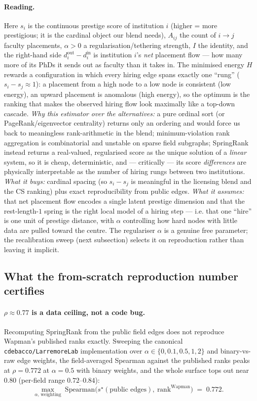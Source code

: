 \documentclass[11pt]{article}
\begin{document}
\paragraph{Reading.} Here $s_i$ is the continuous prestige score of institution $i$ (higher = more prestigious; it is the cardinal object our blend needs), $A_{ij}$ the count of $i\to j$ faculty placements, $\alpha>0$ a regularisation/tethering strength, $I$ the identity, and the right-hand side $d^{\text{out}}_i - d^{\text{in}}_i$ is institution $i$'s \emph{net} placement flow --- how many more of its PhDs it sends out as faculty than it takes in. The minimised energy $H$ rewards a configuration in which every hiring edge spans exactly one ``rung'' ($s_i - s_j \approx 1$): a placement from a high node to a low node is consistent (low energy), an upward placement is anomalous (high energy), so the optimum is the ranking that makes the observed hiring flow look maximally like a top-down cascade. \emph{Why this estimator over the alternatives:} a pure ordinal sort (or PageRank/eigenvector centrality) returns only an ordering and would force us back to meaningless rank-arithmetic in the blend; minimum-violation rank aggregation is combinatorial and unstable on sparse field subgraphs; SpringRank instead returns a real-valued, regularised score as the unique solution of a \emph{linear} system, so it is cheap, deterministic, and --- critically --- its score \emph{differences} are physically interpretable as the number of hiring rungs between two institutions. \emph{What it buys:} cardinal spacing (so $s_i - s_j$ is meaningful in the licensing blend and the CS ranking) plus exact reproducibility from public edges. \emph{What it assumes:} that net placement flow encodes a single latent prestige dimension and that the rest-length-$1$ spring is the right local model of a hiring step --- i.e. that one ``hire'' is one unit of prestige distance, with $\alpha$ controlling how hard nodes with little data are pulled toward the centre. The regulariser $\alpha$ is a genuine free parameter; the recalibration sweep (next subsection) selects it on reproduction rather than leaving it implicit.

\subsection{What the from-scratch reproduction number certifies}

\paragraph{$\rho \approx 0.77$ is a data ceiling, not a code bug.} Recomputing SpringRank from the public field edges does not reproduce Wapman's published ranks exactly. Sweeping the canonical \texttt{cdebacco/LarremoreLab} implementation over $\alpha \in \{0, 0.1, 0.5, 1, 2\}$ and binary-vs-raw edge weights, the field-averaged Spearman against the published ranks peaks at $\rho = 0.772$ at $\alpha = 0.5$ with binary weights, and the whole surface tops out near $0.80$ (per-field range $0.72$--$0.84$):
\[
\max_{\alpha,\,\text{weighting}} \;\overline{\mathrm{Spearman}}\bigl(s^\star(\text{public edges}),\ \text{rank}^{\text{Wapman}}\bigr) \;=\; 0.772 .
\]
\end{document}
